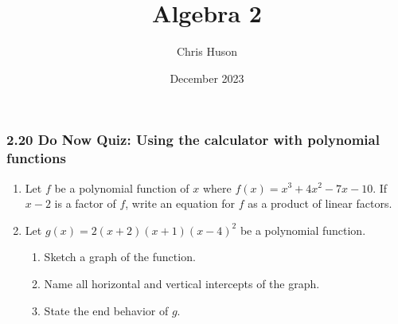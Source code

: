 \documentclass[12pt, twoside]{article}
\title{Algebra 2}
\author{Chris Huson}
\date{December 2023}
\begin{document}
\subsubsection*{2.20 Do Now Quiz: Using the calculator with polynomial functions}
\begin{enumerate}

\subsubsection*{A2-F.IF.7c Graph polynomials, identify zeros, end behavior}

\item Let $f$ be a polynomial function of $x$ where $f(x)=x^3+4x^2-7x-10$. If $x-2$ is a factor of $f$, write an equation for $f$ as a product of linear factors.
\vspace{2.5cm}

\item Let $g(x)=2(x+2)(x+1)(x-4)^2$ be a polynomial function. 
    \begin{center}
    \end{center}
    \begin{enumerate}[itemsep=0.25cm]
        \item Sketch a graph of the function.
        \item Name all horizontal and vertical intercepts of the graph.
        \item State the end behavior of $g$.
    \end{enumerate}

\end{enumerate}
\end{document}

